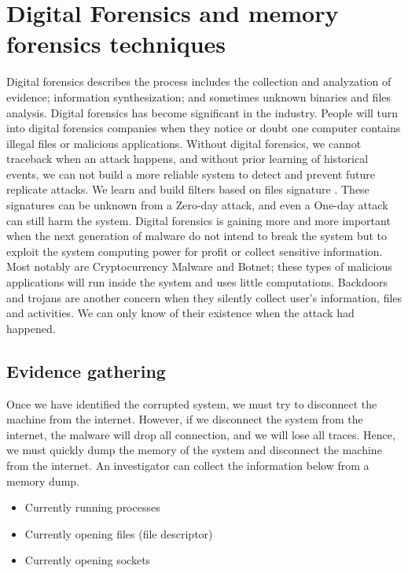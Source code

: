 \section[Digital Forensics and memory forensics techniques]{Digital Forensics and memory forensics techniques}

Digital forensics describes the process includes the collection and analyzation of evidence; information synthesization; and sometimes unknown binaries and files analysis. Digital forensics has become significant in the industry. People will turn into digital forensics companies when they notice or doubt one computer contains illegal files or malicious applications. Without digital forensics, we cannot traceback when an attack happens, and without prior learning of historical events, we can not build a more reliable system to detect and prevent future replicate attacks. We learn and build filters based on files signature \cite{yararules}. These signatures can be unknown from a Zero-day attack, and even a One-day attack can still harm the system. Digital forensics is gaining more and more important when the next generation of malware do not intend to break the system but to exploit the system computing power for profit or collect sensitive information. Most notably are Cryptocurrency Malware and Botnet; these types of malicious applications will run inside the system and uses little computations. Backdoors and trojans are another concern when they silently collect user's information, files and activities. We can only know of their existence when the attack had happened.

\subsection[Evidence gathering]{Evidence gathering}

Once we have identified the corrupted system, we must try to disconnect the machine from the internet. However, if we disconnect the system from the internet, the malware will drop all connection, and we will lose all traces. Hence, we must quickly dump the memory of the system and disconnect the machine from the internet. An investigator can collect the information below from a memory dump.

\begin{itemize}
\item Currently running processes
\item Currently opening files (file descriptor)
\item Currently opening sockets
\end{itemize}

